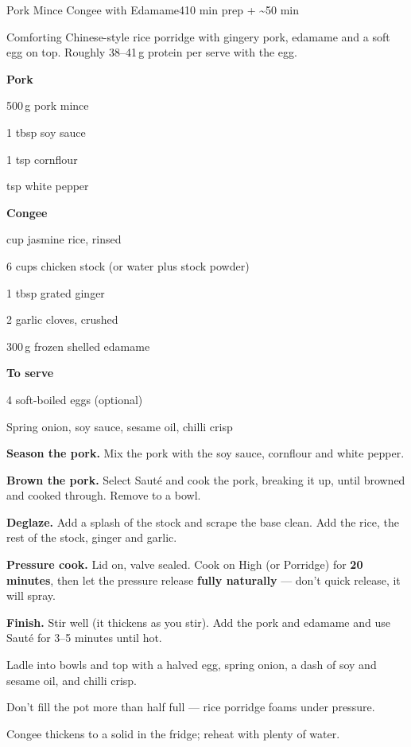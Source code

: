 \begin{recipebox}{Pork Mince Congee with Edamame}{4}{10 min prep + \textasciitilde50 min}

Comforting Chinese-style rice porridge with gingery pork, edamame and a soft
egg on top. Roughly 38--41\,g protein per serve with the egg.

\begin{ingredients}
  \item[] \textbf{Pork}
  \item 500\,g pork mince
  \item 1 tbsp soy sauce
  \item 1 tsp cornflour
  \item {} tsp white pepper
  \item[] \textbf{Congee}
  \item {} cup jasmine rice, rinsed
  \item 6 cups chicken stock (or water plus stock powder)
  \item 1 tbsp grated ginger
  \item 2 garlic cloves, crushed
  \item 300\,g frozen shelled edamame
  \item[] \textbf{To serve}
  \item 4 soft-boiled eggs (optional)
  \item Spring onion, soy sauce, sesame oil, chilli crisp
\end{ingredients}

\begin{method}
  \item \textbf{Season the pork.} Mix the pork with the soy sauce, cornflour and white pepper.
  \item \textbf{Brown the pork.} Select Saut\'e and cook the pork, breaking it up, until browned and cooked through. Remove to a bowl.
  \item \textbf{Deglaze.} Add a splash of the stock and scrape the base clean. Add the rice, the rest of the stock, ginger and garlic.
  \item \textbf{Pressure cook.} Lid on, valve sealed. Cook on High (or Porridge) for \textbf{20 minutes}, then let the pressure release \textbf{fully naturally} --- don't quick release, it will spray.
  \item \textbf{Finish.} Stir well (it thickens as you stir). Add the pork and edamame and use Saut\'e for 3--5 minutes until hot.
  \item Ladle into bowls and top with a halved egg, spring onion, a dash of soy and sesame oil, and chilli crisp.
\end{method}

\begin{notelist}
  \item Don't fill the pot more than half full --- rice porridge foams under pressure.
  \item Congee thickens to a solid in the fridge; reheat with plenty of water.
\end{notelist}

\end{recipebox}
